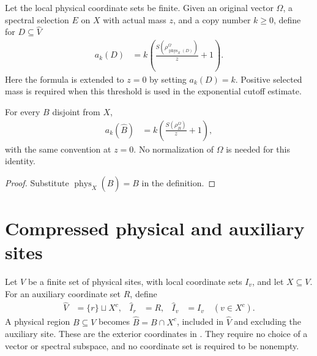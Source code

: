\begin{definition}
\label{def:compressed_regional_threshold}
\leanok
{}
Let the local physical coordinate sets be finite. Given an original vector
$\Omega$, a spectral selection $E$ on $X$ with actual mass $z$, and a
copy number $k\ge0$, define for $D\subseteq\widehat V$
\begin{align}
 a_k(D)&=k\left(\frac{S(\rho^\Omega_{\operatorname{phys}_X(D)})}{z}+1\right).
\end{align}
Here the formula is extended to $z=0$ by setting $a_k(D)=k$. Positive
selected mass is required when this threshold is used in the exponential
cutoff estimate.
\end{definition}

\begin{theorem}
\label{thm:compressed_regional_threshold_lifted}
\leanok
{}
For every $B$ disjoint from $X$,
\begin{align}
 a_k(\widehat B)&=k\left(\frac{S(\rho_B^\Omega)}{z}+1\right),
\end{align}
with the same convention at $z=0$. No normalization of $\Omega$ is needed
for this identity.
\end{theorem}
\begin{proof}
\leanok
Substitute $\operatorname{phys}_X(\widehat B)=B$ in the definition.
\end{proof}

\section{Compressed physical and auxiliary sites}
\label{sec:compressed_site_coordinates}

\begin{definition}
    \label{def:compressed_site_family}
    \leanok
    Let $V$ be a finite set of physical sites, with local coordinate
    sets $I_v$, and let $X\subseteq V$. For an auxiliary coordinate
    set $R$, define
    \begin{align}
        \widehat V&=\{r\}\sqcup X^c,&
        \widehat I_r&=R,&
        \widehat I_v&=I_v\quad(v\in X^c).
    \end{align}
    A physical region $B\subseteq V$ becomes
    $\widehat B=B\cap X^c$, included in $\widehat V$ and excluding the
    auxiliary site. These are the exterior coordinates in
    \cite[\texttt{07-comparators.tex}, lines 240--247 and
    283--308]{OpenAI2026AreaLaw}. They require no choice of a vector or
    spectral subspace, and no coordinate set is required to be nonempty.
\end{definition}


